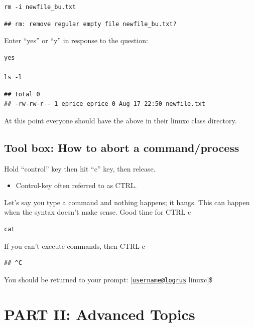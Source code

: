 \documentclass[
]{book}
\providecommand{\tightlist}{%
  \setlength{\itemsep}{0pt}\setlength{\parskip}{0pt}}
\begin{document}
\begin{verbatim}
rm -i newfile_bu.txt
\end{verbatim}

\begin{verbatim}
## rm: remove regular empty file newfile_bu.txt?
\end{verbatim}

Enter ``yes'' or ``y'' in response to the question:

\begin{verbatim}
yes

ls -l
\end{verbatim}

\begin{verbatim}
## total 0
## -rw-rw-r-- 1 eprice eprice 0 Aug 17 22:50 newfile.txt
\end{verbatim}

At this point everyone should have the above in their linuxc class directory.

\hypertarget{tool-box-how-to-abort-a-commandprocess}{%
\subsection{Tool box: How to abort a command/process}\label{tool-box-how-to-abort-a-commandprocess}}

Hold ``control'' key then hit ``c'' key, then release.

\begin{itemize}
\tightlist
\item
  Control-key often referred to as CTRL.
\end{itemize}

Let's say you type a command and nothing happens; it hangs.
This can happen when the syntax doesn't make sense.
Good time for CTRL c

\begin{verbatim}
cat
\end{verbatim}

If you can't execute commands, then CTRL c

\begin{verbatim}
## ^C
\end{verbatim}

You should be returned to your prompt: {[}\href{mailto:username@logrus}{\nolinkurl{username@logrus}} linuxc{]}\$

\hypertarget{part-ii-advanced-topics}{%
\section{PART II: Advanced Topics}\label{part-ii-advanced-topics}}
\end{document}
